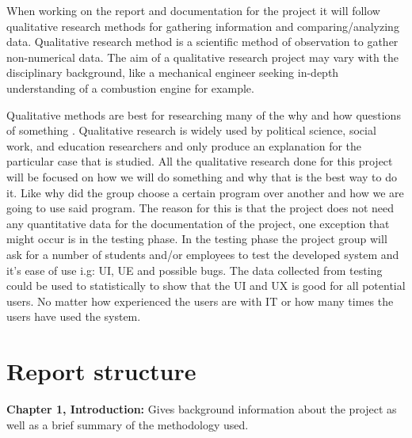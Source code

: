 
 When working on the report and documentation for the project it will follow qualitative research methods for gathering information and comparing/analyzing data. Qualitative research method is a scientific method of observation to gather non-numerical data. The aim of a qualitative research project may vary with the disciplinary background, like a mechanical engineer seeking in-depth understanding of a combustion engine for example.
 
 Qualitative methods are best for researching many of the why and how questions of something \cite{Qualitative-Research}. Qualitative research is widely used by political science, social work, and education researchers and only produce an explanation for the particular case that is studied. All the qualitative research done for this project will be focused on how we will do something and why that is the best way to do it. Like why did the group choose a certain program over another and how we are going to use said program. The reason for this is that the project does not need any quantitative data for the documentation of the project, one exception that might occur is in the testing phase. In the testing phase the project group will ask for a number of students and/or employees to test the developed system and it's ease of use i.g: UI, UE and possible bugs. The data collected from testing could be used to statistically to show that the UI and UX is good for all potential users. No matter how experienced the users are with IT or how many times the users have used the system.

\section{Report structure}

\textbf{Chapter 1, Introduction:}
Gives background information about the project as well as a brief summary of the methodology used.

